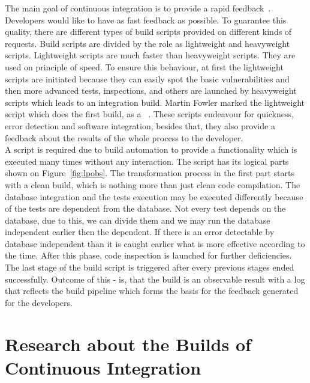The main goal of continuous integration is to provide a rapid feedback~\cite{MartinFowler}. Developers would like to have as fast feedback as possible. To guarantee this quality, there are different types of build scripts provided on different kinds of requests. Build scripts are divided by the role as lightweight and heavyweight scripts. Lightweight scripts are much faster than heavyweight scripts. They are used on principle of speed. To ensure this behaviour, at first the lightweight scripts are initiated because they can easily spot the basic vulnerabilities and then more advanced tests, inspections, and others are launched by heavyweight scripts which leads to an integration build. Martin Fowler marked the lightweight script which does the first build, as a ~\cite{MartinFowler}. These scripts endeavour for quickness, error detection and software integration, besides that, they also provide a feedback about the results of the whole process to the developer.\\

A script is required due to build automation to provide a  functionality which is executed many times without any interaction. The script has its logical parts shown on Figure~\ref{fig:lpobs}. The transformation process in the first part starts with a clean build, which is nothing more than just clean code compilation. The database integration and the tests execution may be executed differently because of the tests are dependent from the database. Not every test depends on the database, due to this, we can divide them and we may run the database independent earlier then the dependent. If there is an error detectable by database independent than it is caught earlier what is more effective according to the time. After this phase, code inspection is launched for further deficiencies. The last stage of the build script is triggered after every previous stages ended successfully. Outcome of this - is, that the build is an observable result with a log that reflects the build pipeline which forms the basis for the feedback generated for the developers.

\section{Research about the Builds of Continuous Integration}

